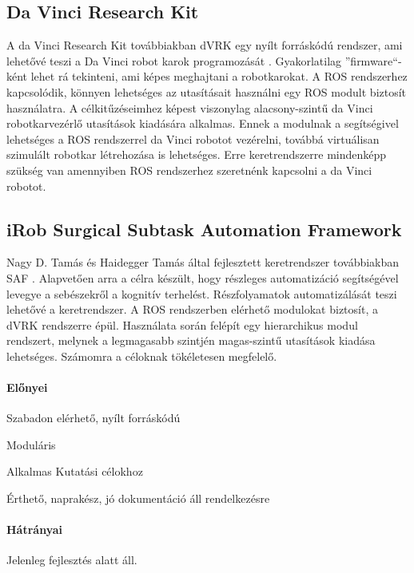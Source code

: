 \documentclass[12pt,a4paper,oneside]{report} %
\begin{document}
\subsection{Da Vinci Research Kit}
\label{davinci}
A da Vinci Research Kit továbbiakban dVRK egy nyílt forráskódú rendszer, ami lehetővé teszi a Da Vinci robot karok programozását \cite{kazanzides2014open}. Gyakorlatilag ''firmware``-ként lehet rá tekinteni, ami képes meghajtani a robotkarokat.  A ROS rendszerhez kapcsolódik, könnyen lehetséges az utasításait használni egy ROS  modult biztosít használatra.  A célkitűzéseimhez képest viszonylag alacsony-szintű da Vinci robotkarvezérlő utasítások kiadására alkalmas.
Ennek a modulnak a segítségivel lehetséges a ROS rendszerrel da Vinci robotot vezérelni, továbbá virtuálisan szimulált robotkar létrehozása is lehetséges. Erre keretrendszerre mindenképp szükség van amennyiben ROS rendszerhez szeretnénk kapcsolni a da Vinci robotot. 
\subsection{iRob Surgical Subtask Automation Framework}
\label{irob}
Nagy D. Tamás és Haidegger Tamás által fejlesztett keretrendszer továbbiakban SAF \cite{irobsaf2019}.
Alapvetően arra a célra készült, hogy részleges automatizáció segítségével levegye a sebészekről a kognitív terhelést. Részfolyamatok automatizálását teszi lehetővé a keretrendszer. A ROS rendszerben elérhető modulokat biztosít, a dVRK rendszerre épül. Használata során felépít egy hierarchikus modul rendszert, melynek a legmagasabb szintjén magas-szintű utasítások kiadása lehetséges. Számomra a céloknak tökéletesen megfelelő.
\paragraph{Előnyei} 
\begin{compactitem}
	\item Szabadon elérhető, nyílt forráskódú
	\item Moduláris
	\item Alkalmas Kutatási célokhoz
	\item Érthető, naprakész, jó dokumentáció áll rendelkezésre
\end{compactitem}
\paragraph{Hátrányai} 
\begin{compactitem}
	\item Jelenleg fejlesztés alatt áll.
\end{compactitem}
\end{document}
